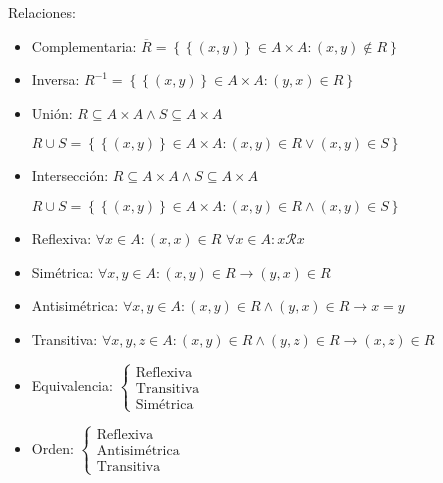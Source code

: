 \documentclass[a4paper, twoside]{article}
\begin{document}
	Relaciones:
	\begin{itemize}
		\item Complementaria: $\overline{R} = \left\{ \left\{ (x,y) \right\} \in A \times A: (x,y) \notin R\right\}$
		
		\item Inversa: $R^{-1} = \left\{ \left\{ (x,y) \right\} \in A \times A: (y,x) \in R\right\}$
		
		\item  Unión: $R \subseteq A \times A \wedge S \subseteq A \times A$
		
		\begin{center}
		$R \cup S = \left\{ \left\{ (x,y) \right\} \in A \times A: (x,y) \in R \lor (x,y) \in S \right\}$
		\end{center}		

		\item Intersección: $R \subseteq A \times A \wedge S \subseteq A \times A$
		
		\begin{center}
		$R \cup S = \left\{ \left\{ (x,y) \right\} \in A \times A: (x,y) \in R \wedge (x,y) \in S \right\}$
		\end{center}
		
		\item Reflexiva: $\forall x \in A: (x,x) \in R$
						 $\forall x \in A: x \mathcal{R} x$
		
		\item Simétrica: $\forall x,y \in A: (x,y) \in R \rightarrow (y,x) \in R$
				
		\item Antisimétrica: $\forall x,y \in A: (x,y) \in R \wedge (y,x) \in R \rightarrow x = y$
		
		\item Transitiva: $\forall x,y,z \in A: (x,y) \in R \wedge (y,z) \in R \rightarrow (x,z) \in R$
		
		\item Equivalencia: $\left\{ \begin{array}{c}
							\text{Reflexiva}\\
							\text{Transitiva}\\
							\text{Simétrica}\end{array}\right.$
		
		\item Orden: $\left\{ \begin{array}{c}
							\text{Reflexiva}\\
							\text{Antisimétrica}\\
							\text{Transitiva}\end{array}\right.$
	\end{itemize}
	
\end{document}

